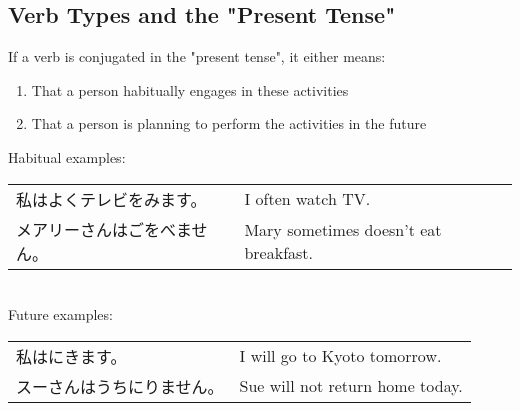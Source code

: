 \documentclass{article}
\newenvironment{gex}
{
	\,\\
	\renewcommand{\arraystretch}{1.5}
    \begin{tabular}{m{20em} l}
}
{
	\end{tabular}
	\renewcommand{\arraystretch}{1}
	\\
}
\begin{document}
   
   
   
   \subsection{Verb Types and the "Present Tense"}
   If a verb is conjugated in the "present tense", it either means:
   \begin{enumerate}
   \item That a person habitually engages in these activities 
   \item That a person is planning to perform the activities in the future
   \end{enumerate}
   Habitual examples:
   \begin{gex}
   私はよくテレビを\ruby{読}{よ}みます。 & I often watch TV. \\
   メアリーさんは\ruby{時}{とき}\ruby{々}{どき}\ruby{朝}{あさ}ご\ruby{飯}{はん}を\ruby{食}{た}べません。 & Mary sometimes doesn't eat breakfast.
   \end{gex}
   Future examples:
   \begin{gex}
   私は\ruby{明日}{あした}\ruby{京都}{きょうと}に\ruby{行}{い}きます。 & I will go to Kyoto tomorrow. \\
   スーさんは\ruby{今日}{きょう}うちに\ruby{帰}{かえ}りません。 & Sue will not return home today. 
   \end{gex}
   
   
   
\end{document}
